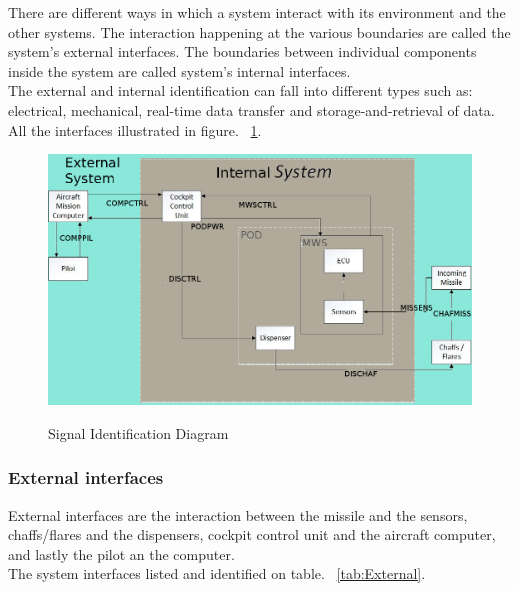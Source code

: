 There are different ways in which a system interact with its environment and the other systems. The interaction happening at the various boundaries are called the system's external interfaces. The boundaries between individual components inside the system are called system's internal interfaces.\\
The external and internal identification can fall into different types such as: electrical, mechanical, real-time data transfer and storage-and-retrieval of data. All the interfaces illustrated in figure. ~\ref{fig:sigFlowDiagram}.

  \begin{figure}[h]
  	\centering
 	\includegraphics[scale=0.5]{./images/SignalFlowDiagramDDD_v2}\\
  	\caption{Signal Identification Diagram}
      \label{fig:sigFlowDiagram}
  \end{figure}
\newpage
\subsubsection{External interfaces}
 External interfaces are the interaction between the missile and the sensors, chaffs/flares and the dispensers, cockpit control unit and the aircraft computer, and lastly the pilot an the computer.\\
 The system interfaces listed and identified on table. ~\ref{tab:External}.



